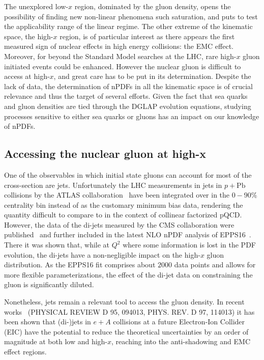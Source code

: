 The unexplored low-$x$ region, dominated by the gluon density, opens the possibility of finding new non-linear phenomena such saturation, and puts to test the applicability range of the linear regime. The other extreme of the kinematic space, the high-$x$ region, is of particular interest as there appears the first measured sign of nuclear effects in high energy collisions: the EMC effect. Moreover, for beyond the Standard Model searches at the LHC, rare high-$x$ gluon initiated events could be enhanced. However the nuclear gluon is difficult to access at high-$x$, and great care has to be put in its determination. Despite the lack of data, the determination of nPDFs in all the kinematic space is of crucial relevance and thus the target of several efforts. Given the fact that sea quarks and gluon densities are tied through the DGLAP evolution equations, studying processes sensitive to either sea quarks or gluons has an impact on our knowledge of nPDFs.    



\subsection{Accessing the nuclear gluon at high-x}

One of the observables in which initial state gluons can account for most of the cross-section are jets. Unfortunately the LHC measurements in jets in $p+\mathrm{Pb}$ collisions by the ATLAS collaboration~\cite{FIXME} have been integrated over in the $0-90\%$ centrality bin instead of as the customary minimum bias data, rendering the quantity difficult to compare to in the context of collinear factorized pQCD. However, the data of the di-jets measured by the CMS collaboration were published~\cite{FIXME} and further included in the latest NLO nPDF analysis of EPPS16~\cite{FIXME}. There it was shown that, while at $Q^{2}$ where some information is lost in the PDF evolution, the di-jets have a non-negligible impact on the high-$x$ gluon distribution. As the EPPS16 fit comprises about $2000$ data points and allows for more flexible parameterizations, the effect of the di-jet data on constraining the gluon is significantly diluted. 

Nonetheless, jets remain a relevant tool to access the gluon density. In recent works~\cite{FIXME} (PHYSICAL REVIEW D 95, 094013, PHYS. REV. D 97, 114013) it has been shown that (di-)jets in $e+A$ collisions at a future Electron-Ion Collider (EIC) have the potential to reduce the theoretical uncertainties by an order of magnitude at both low and high-$x$, reaching into the anti-shadowing and EMC effect regions.

